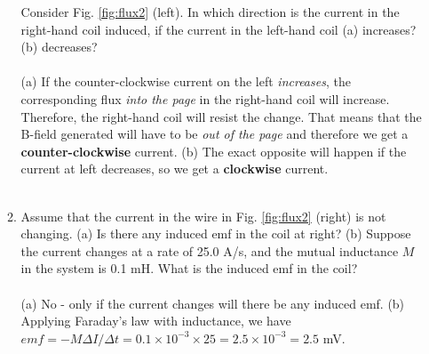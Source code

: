 \documentclass[10pt]{article}
\begin{document}
\begin{enumerate}
\begin{enumerate}
\begin{figure}
\end{figure}
Consider Fig. \ref{fig:flux2} (left).  In which direction is the current in the right-hand coil induced, if the current in the left-hand coil (a) increases?  (b) decreases? \\ \\
(a) If the counter-clockwise current on the left \textit{increases}, the corresponding flux \textit{into the page} in the right-hand coil  will increase.  Therefore, the right-hand coil will resist the change.  That means that the B-field generated will have to be \textit{out of the page} and therefore we get a \textbf{counter-clockwise} current.  (b) The exact opposite will happen if the current at left decreases, so we get a \textbf{clockwise} current. \\ \\
\item Assume that the current in the wire in Fig. \ref{fig:flux2} (right) is not changing.  (a) Is there any induced emf in the coil at right? (b) Suppose the current changes at a rate of 25.0 A/s, and the mutual inductance $M$ in the system is 0.1 mH.  What is the induced emf in the coil? \\ \\
(a) No - only if the current changes will there be any induced emf. (b) Applying Faraday's law with inductance, we have $emf = -M\Delta I/\Delta t = 0.1 \times 10^{-3} \times 25 = 2.5 \times 10^{-3} = 2.5$ mV.
\end{enumerate}
\end{enumerate}
\end{document}
